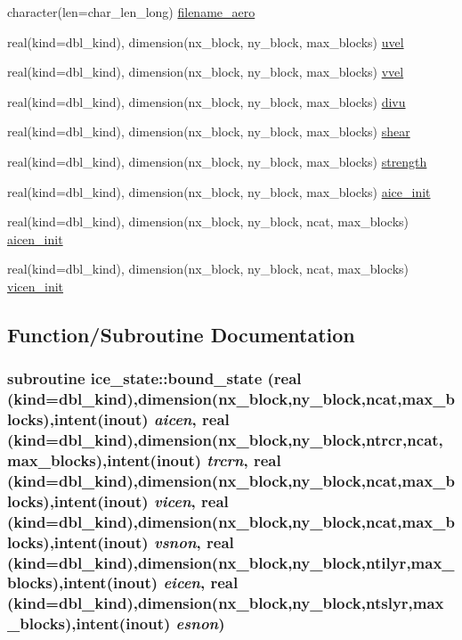 \begin{DoxyCompactItemize}
\item 
character(len=char\_\-len\_\-long) \hyperlink{namespaceice__state_ab5f78ad535732539802475cc958d8bc0}{filename\_\-aero}
\item 
real(kind=dbl\_\-kind), dimension(nx\_\-block, ny\_\-block, max\_\-blocks) \hyperlink{namespaceice__state_a74f862ad20a4ee9051006a6db77c4bc5}{uvel}
\item 
real(kind=dbl\_\-kind), dimension(nx\_\-block, ny\_\-block, max\_\-blocks) \hyperlink{namespaceice__state_ae19e42c4089f6a3a8426fb5847cf748e}{vvel}
\item 
real(kind=dbl\_\-kind), dimension(nx\_\-block, ny\_\-block, max\_\-blocks) \hyperlink{namespaceice__state_a1d4ddf61ed16b9ab3bf546bfb006628b}{divu}
\item 
real(kind=dbl\_\-kind), dimension(nx\_\-block, ny\_\-block, max\_\-blocks) \hyperlink{namespaceice__state_aac4fe23f1dbcb435f711d8446d83dcca}{shear}
\item 
real(kind=dbl\_\-kind), dimension(nx\_\-block, ny\_\-block, max\_\-blocks) \hyperlink{namespaceice__state_a4f093119aa04b4e413418f77e12f0cf6}{strength}
\item 
real(kind=dbl\_\-kind), dimension(nx\_\-block, ny\_\-block, max\_\-blocks) \hyperlink{namespaceice__state_a02c92db0074e9bcdb95221ca85472f20}{aice\_\-init}
\item 
real(kind=dbl\_\-kind), dimension(nx\_\-block, ny\_\-block, ncat, max\_\-blocks) \hyperlink{namespaceice__state_abbaa812633c91cc57a5bad8a2b43920a}{aicen\_\-init}
\item 
real(kind=dbl\_\-kind), dimension(nx\_\-block, ny\_\-block, ncat, max\_\-blocks) \hyperlink{namespaceice__state_ac5cee5fad34f6b73399069dda488adab}{vicen\_\-init}
\end{DoxyCompactItemize}


\subsection{Function/Subroutine Documentation}
\hypertarget{namespaceice__state_a78d0e2cfa0bf0b06213526515ea5bb15}{
\subsubsection[{bound\_\-state}]{\setlength{\rightskip}{0pt plus 5cm}subroutine ice\_\-state::bound\_\-state (real (kind=dbl\_\-kind),dimension(nx\_\-block,ny\_\-block,ncat,max\_\-blocks),intent(inout) {\em aicen}, \/  real (kind=dbl\_\-kind),dimension(nx\_\-block,ny\_\-block,ntrcr,ncat,max\_\-blocks),intent(inout) {\em trcrn}, \/  real (kind=dbl\_\-kind),dimension(nx\_\-block,ny\_\-block,ncat,max\_\-blocks),intent(inout) {\em vicen}, \/  real (kind=dbl\_\-kind),dimension(nx\_\-block,ny\_\-block,ncat,max\_\-blocks),intent(inout) {\em vsnon}, \/  real (kind=dbl\_\-kind),dimension(nx\_\-block,ny\_\-block,ntilyr,max\_\-blocks),intent(inout) {\em eicen}, \/  real (kind=dbl\_\-kind),dimension(nx\_\-block,ny\_\-block,ntslyr,max\_\-blocks),intent(inout) {\em esnon})}}
\label{namespaceice__state_a78d0e2cfa0bf0b06213526515ea5bb15}


